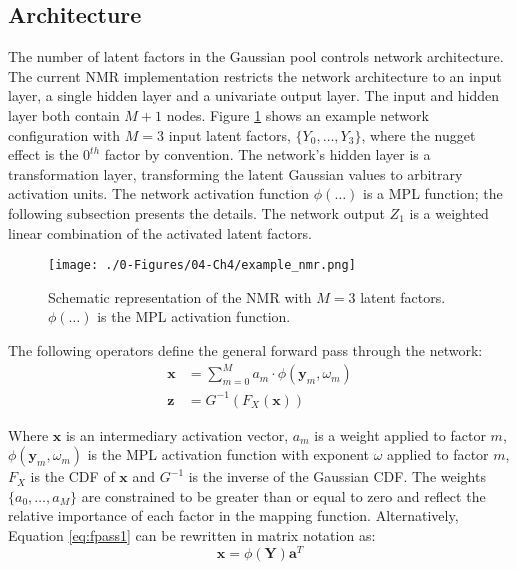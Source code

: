 \subsection{Architecture}
\label{subsec:04arch}

The number of latent factors in the Gaussian pool controls network architecture. The current \gls{NMR} implementation restricts the network architecture to an input layer, a single hidden layer and a univariate output layer. The input and hidden layer both contain $M+1$ nodes. Figure \ref{fig:example_nmr} shows an example network configuration with $M=3$ input latent factors, $\{ Y_{0}, \dots, Y_{3}\}$, where the nugget effect is the $0^{th}$ factor by convention. The network's hidden layer is a transformation layer, transforming the latent Gaussian values to arbitrary activation units. The network activation function $\phi(\dots)$ is a \gls{MPL} function; the following subsection presents the details. The network output $Z_{1}$ is a weighted linear combination of the activated latent factors.

\begin{figure}[htb!]
    \centering
    \texttt{[image: ./0-Figures/04-Ch4/example\_nmr.png]}
    \caption{Schematic representation of the \gls{NMR} with $M=3$ latent factors. $\phi(\dots)$ is the \gls{MPL} activation function. }
    \label{fig:example_nmr}
\end{figure}

The following operators define the general forward pass through the network:
\begin{align}
    \label{eq:fpass1}
    \mathbf{x} & = \sum_{m=0}^{M}a_{m} \cdot \phi(\mathbf{y}_{m}, \omega_{m}) \\
    \label{eq:fpass2}
    \mathbf{z} & = G^{-1}\left( F_{X}\left(\mathbf{x} \right)\right)
\end{align}

Where $\mathbf{x}$ is an intermediary activation vector, $a_{m}$ is a weight applied to factor $m$, $\phi(\mathbf{y}_{m}, \omega_{m})$ is the \gls{MPL} activation function with exponent $\omega$ applied to factor $m$, $F_{X}$ is the \gls{CDF} of $\mathbf{x}$ and $G^{-1}$ is the inverse of the Gaussian \gls{CDF}. The weights $\{ a_{0}, \dots, a_{M}\}$ are constrained to be greater than or equal to zero and reflect the relative importance of each factor in the mapping function. Alternatively, Equation \ref{eq:fpass1} can be rewritten in matrix notation as:
\begin{equation}
    \mathbf{x} = \phi\left( \mathbf{Y} \right) \mathbf{a}^{T}
    \label{eq:fpass3}
\end{equation}

